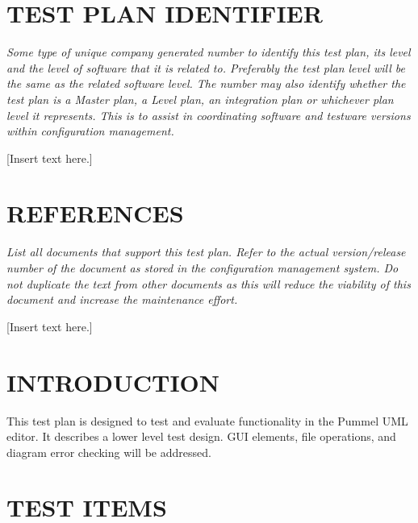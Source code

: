 \documentclass[twoside,letterpaper]{article}
\begin{document}
\bigskip

\bigskip
\setcounter{page}{1}\pagestyle{Convertiv}

\section[IDENTIFIER]{\bfseries\color{black}
TEST PLAN IDENTIFIER}

{\itshape\color{black}
Some type of unique company generated number to identify this test
plan, its level and the level of software that it is related
to. Preferably the test plan level will be the same as the related
software level. The number may also identify whether the test plan is
a Master plan, a Level plan, an integration plan or whichever plan
level it represents. This is to assist in coordinating software and
testware versions within configuration management.
}

{\color{black}
[Insert text here.]}


\section[REFERENCES]{\bfseries\color{black}
REFERENCES}

{\itshape\color{black}
List all documents that support this test plan. Refer to the actual
version/release number of the document as stored in the configuration
management system. Do not duplicate the text from other documents as
this will reduce the viability of this document and increase the
maintenance effort.
}

{\color{black}
[Insert text here.]}



\section[INTRODUCTION]{\bfseries\color{black} INTRODUCTION}
{\color{black}
This test plan is designed to test and evaluate functionality in the Pummel UML editor. It describes a lower level test design. GUI elements, file operations, and diagram error checking will be addressed.
}

\section[TEST ITEMS]{\bfseries\color{black} TEST ITEMS}
\end{document}
